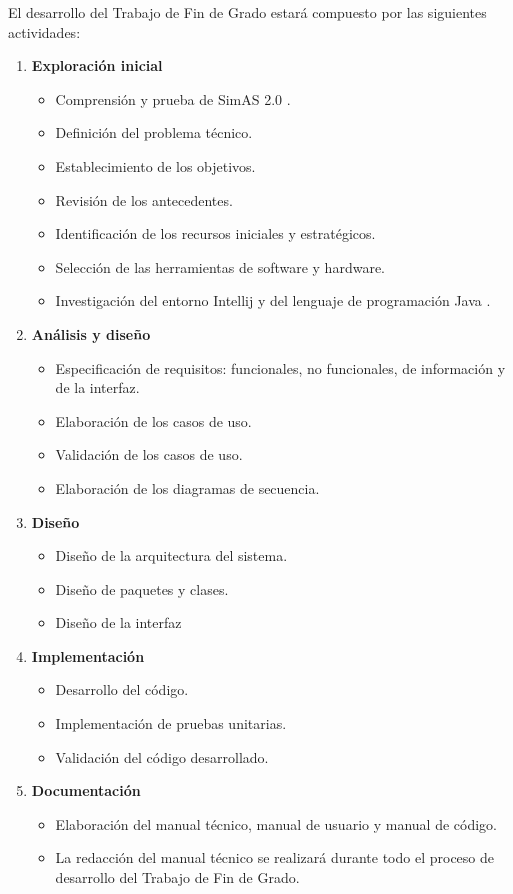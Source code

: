 El desarrollo del Trabajo de Fin de Grado estará compuesto por las siguientes actividades:
\begin{enumerate}
    \item \textbf{Exploración inicial} 
        \begin{itemize}
            \item Comprensión y prueba de SimAS 2.0 \cite{juan}.
            \item Definición del problema técnico.
            \item Establecimiento de los objetivos.
            \item Revisión de los antecedentes.
            \item Identificación de los recursos iniciales y estratégicos.
            \item Selección de las herramientas de software y hardware.
            \item Investigación del entorno Intellij \cite{intellij} y del lenguaje de programación Java \cite{java}.
        \end{itemize}
    \item \textbf{Análisis y diseño}
        \begin{itemize}
            \item Especificación de requisitos: funcionales, no funcionales, de información y de la interfaz.
            \item Elaboración de los casos de uso.
            \item Validación de los casos de uso.
            \item Elaboración de los diagramas de secuencia.
        \end{itemize}
    \item \textbf{Diseño}
        \begin{itemize}
            \item Diseño de la arquitectura del sistema.
            \item Diseño de paquetes y clases.
            \item Diseño de la interfaz
        \end{itemize}        
    \item \textbf{Implementación}
        \begin{itemize}
            \item Desarrollo del código.
            \item Implementación de pruebas unitarias.
            \item Validación del código desarrollado.
        \end{itemize} 
    \item \textbf{Documentación}
      \begin{itemize}
          \item Elaboración del manual técnico, manual de usuario y manual de código.
          \item La redacción del manual técnico se realizará durante todo el proceso de desarrollo del Trabajo de Fin de Grado.
      \end{itemize}
\end{enumerate}

